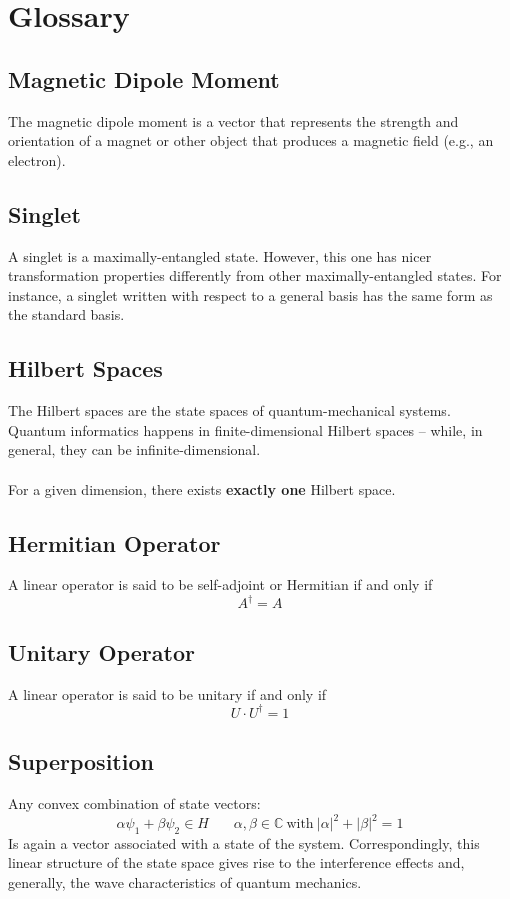 \documentclass{article}
\begin{document}
\pagebreak
\section{Glossary}
\subsection{Magnetic Dipole Moment}
The magnetic dipole moment is a vector that represents the strength and orientation of a magnet or other object that produces a magnetic field (e.g., an electron).

\subsection{Singlet}
A singlet is a maximally-entangled state. However, this one has nicer transformation properties differently from other maximally-entangled states. For instance, a singlet written with respect to a general basis has the same form as the standard basis.

\subsection{Hilbert Spaces}
The Hilbert spaces are the state spaces of quantum-mechanical systems. Quantum informatics happens in finite-dimensional Hilbert spaces -- while, in general, they can be infinite-dimensional. \\ \\
For a given dimension, there exists \textbf{exactly one} Hilbert space.

\subsection{Hermitian Operator}
A linear operator is said to be self-adjoint or Hermitian if and only if
\[ A^\dagger = A \]

\subsection{Unitary Operator}
A linear operator is said to be unitary if and only if
\[ U \cdot U^\dagger = 1 \]

\subsection{Superposition}
Any convex combination of state vectors:
\[ \alpha \psi_1 + \beta \psi_2 \in H ~~~~~~~~ \alpha, \beta \in \mathbb{C}~\text{with}~ |\alpha|^2 + |\beta|^2 = 1 \]
Is again a vector associated with a state of the system. Correspondingly, this linear structure of the state space gives rise to the interference effects and, generally, the wave characteristics of quantum mechanics.
\end{document}
